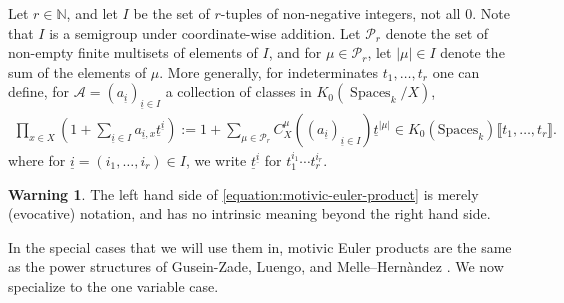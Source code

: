 \documentclass[12 pt]{amsart}
\theoremstyle{plain}
\theoremstyle{definition}
\newtheorem{warn}[theorem]{Warning}
\theoremstyle{remark}
\numberwithin{equation}{section}
\newcommand\grSpaces{K_0(\mathrm{Spaces}_k)} %
\newcommand{\on}[1]{\operatorname{#1}}
\begin{document}
%

Let $r\in \mathbb N$, and let $I$ be the set of $r$-tuples of non-negative integers, not all $0$.  Note that $I$ is a semigroup under coordinate-wise addition.  Let $\mathcal{P}_r$ denote the set of non-empty finite multisets of elements of $I$, and for $\mu\in \mathcal{P}_r$, let $|\mu|\in I$
denote the sum of the elements of $\mu$.
More generally, for indeterminates $t_1,\dots, t_r$
one can define, for $\mathcal A =
(a_{\underline{i}})_{\underline{i} \in I}$ a collection of classes in $K_0(\on{Spaces}_k/X)$, 
\begin{align} 
	\label{equation:motivic-euler-product-generalized}	
	\prod_{x \in X} \left(
		1 + \sum_{\underline{i} \in I} a_{\underline{i},x} \underline{t}^{\underline{i}}
		\right) := 1+ \sum_{\mu \in \mathcal P_r}
	C^\mu_{X}((a_{\underline{i}})_{\underline{i} \in I}) 
 \underline{t}^{|\mu|}
 \in \grSpaces \llbracket
	t_1,\dots,t_r \rrbracket.
\end{align} 
where for $\underline{i}=(i_1,\dots,i_r)\in I$, we write $\underline{t}^{\underline{i}}$ for $t_1^{i_1}\cdots t_r^{i_r}$.

\begin{warn}
	\label{warning:}
	The left hand side of \eqref{equation:motivic-euler-product} is
	merely (evocative) notation, and has no intrinsic meaning beyond the
	right hand side. 
\end{warn}

In the special cases that we will use them in,  motivic Euler products are the same as the power structures of
Gusein-Zade, Luengo, and Melle–Hern\`{a}ndez \cite{Gusein-Zade2004}.
  We now specialize to the one variable case.
\end{document}
